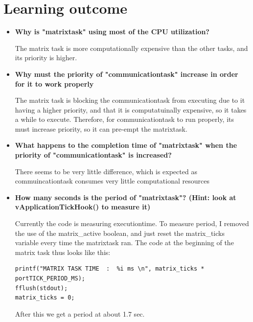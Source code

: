 \documentclass[12pt,fleqn,leqno,letterpaper]{article}
\begin{document}
    \section*{Learning outcome}
        \begin{itemize}
            \item \textbf{Why is "matrixtask" using most of the CPU utilization?}
        
        The matrix task is more computationally expensive than the other tasks, and its priority is higher.

            \item \textbf{Why must the priority of "communicationtask" increase in order for it to work properly}
        
        The matrix task is blocking the communicationtask from executing due to it having a higher priority, and that it is 
        computatuinally expensive, so it takes a while to execute. Therefore, for communicationtask to run properly, its must
        increase priority, so it can pre-empt the matrixtask.

            \item \textbf{What happens to the completion time of "matrixtask" when the priority of "communicationtask" is increased?}
        
        There seems to be very little difference, which is expected as commuincationtask consumes very little computational resources

            \item \textbf{How many seconds is the period of "matrixtask"? (Hint: look at vApplicationTickHook() to measure it)}
        
        Currently the code is measuring executiontime.  To measure period, I removed the use of the matrix\_active boolean, and just reset the 
        matrix\_ticks variable every time the matrixtask ran.  The code at the beginning of the matrix task thus looks like this:

        \begin{verbatim}
printf("MATRIX TASK TIME  :  %i ms \n", matrix_ticks * portTICK_PERIOD_MS);
fflush(stdout);
matrix_ticks = 0;
        \end{verbatim}

        After this we get a period at about 1.7 sec.

        \end{itemize}

    
\end{document}

